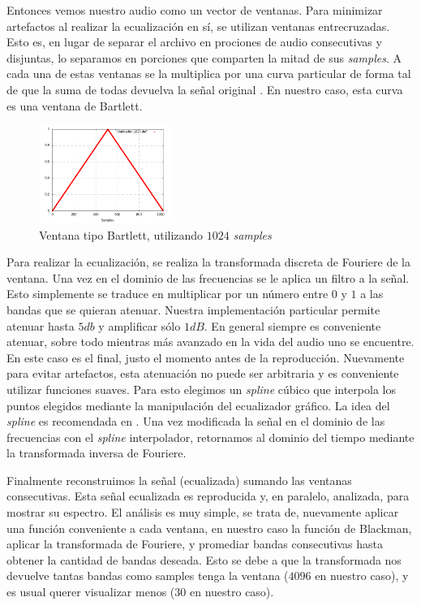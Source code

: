 \documentclass[%
    compressed,
    titlepage,
    narroweqnarray,
    inline,
    twoside,
    ]{ieee}
\begin{document}
Entonces vemos nuestro audio como un vector de ventanas. Para minimizar artefactos al realizar la ecualizaci\'on
en s\'i, se utilizan ventanas entrecruzadas. Esto es, en lugar de separar el archivo en prociones de audio
consecutivas y disjuntas, lo separamos en porciones que comparten la mitad de sus \textit{samples}. A cada una
de estas ventanas se la multiplica por una curva particular de forma tal de que la suma de todas devuelva la se\~nal original
\cite[Generalized Window Method]{SASP}. En nuestro caso, esta curva es una ventana de Bartlett.

\begin{figure}
    \begin{center}
        \includegraphics[width=0.38\textwidth]{img/bartlett1024.png}
    \end{center}
    \caption{Ventana tipo Bartlett, utilizando $1024$ \textit{samples}}
\end{figure}

Para realizar la ecualizaci\'on, se realiza la transformada discreta de Fouriere de la ventana.
Una vez en el dominio de las frecuencias se le aplica un filtro a la se\~nal. Esto simplemente se traduce en
multiplicar por un n\'umero entre $0$ y $1$ a las bandas que se quieran atenuar. Nuestra implementaci\'on particular permite atenuar
hasta $5db$ y amplificar s\'olo $1dB$. En general siempre es conveniente atenuar, sobre todo mientras m\'as avanzado en
la vida del audio uno se encuentre. En este caso es el final, justo el momento antes de la reproducci\'on.
Nuevamente para evitar artefactos, esta atenuaci\'on no puede ser arbitraria y es conveniente utilizar funciones
suaves. Para esto elegimos un \textit{spline} c\'ubico que interpola los puntos elegidos mediante la manipulaci\'on del
ecualizador gr\'afico. La idea del \textit{spline} es recomendada en \cite[Generalized Window Method]{SASP}.
Una vez modificada la se\~nal en el dominio de las frecuencias con el \textit{spline} interpolador, retornamos al dominio
del tiempo mediante la transformada inversa de Fouriere.

Finalmente reconstruimos la se\~nal (ecualizada) sumando las ventanas consecutivas.
Esta se\~nal ecualizada es reproducida y, en paralelo, analizada, para mostrar su espectro.
El an\'alisis es muy simple, se trata de, nuevamente aplicar una funci\'on conveniente a cada ventana, en nuestro
caso la funci\'on de Blackman, aplicar la transformada de Fouriere, y promediar bandas consecutivas
hasta obtener la cantidad de bandas deseada. Esto se debe a que la transformada nos devuelve tantas bandas como samples
tenga la ventana ($4096$ en nuestro caso), y es usual querer visualizar menos ($30$ en nuestro caso).
\end{document}
